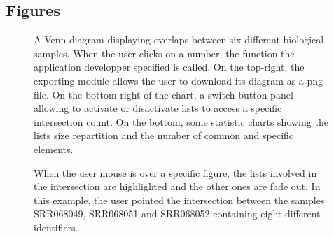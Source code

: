 \documentclass{bmcart}
\begin{document}
\begin{backmatter}

\section*{Figures}
  \begin{figure}[h!]
  \caption{
      A Venn diagram displaying overlaps between six different biological samples. When 
      the user clicks on a number, the function the application developper specified is called. 
      On the top-right, the exporting module allows the user to download its diagram as a png 
      file. On the bottom-right of the chart, a switch button panel allowing to activate or 
      disactivate lists to access a specific intersection count. On the bottom, some statistic 
      charts showing the lists size repartition and the number of common and specific elements.}
      \end{figure}

\begin{figure}[h!]
  \caption{
      When the user mouse is over a specific figure, the lists involved in the intersection
      are highlighted and the other ones are fade out. In this example, the user pointed the
      intersection between the samples SRR068049, SRR068051 and SRR068052 containing eight 
      different identifiers.}
      \end{figure}



\end{backmatter}
\end{document}
